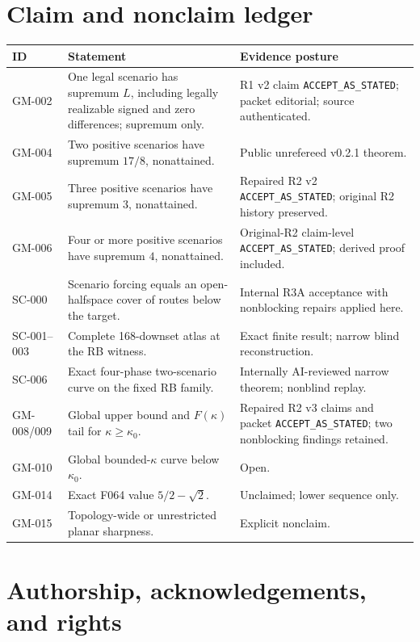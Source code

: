 \documentclass[11pt]{article}
\theoremstyle{remark}
\begin{document}
\section{Claim and nonclaim ledger}

\begin{longtable}{@{}
  >{\raggedright\arraybackslash}p{}
  >{\raggedright\arraybackslash}p{}
  >{\raggedright\arraybackslash}p{}@{}}
\toprule
ID & Statement & Evidence posture\\
\midrule
\endhead
GM-002 & One legal scenario has supremum $L$, including legally realizable
signed and zero differences; supremum only. & R1 v2 claim
\texttt{ACCEPT\_AS\_STATED}; packet editorial; source authenticated.\\
GM-004 & Two positive scenarios have supremum $17/8$, nonattained. & Public
unrefereed v0.2.1 theorem.\\
GM-005 & Three positive scenarios have supremum $3$, nonattained. & Repaired
R2 v2 \texttt{ACCEPT\_AS\_STATED}; original R2 history preserved.\\
GM-006 & Four or more positive scenarios have supremum $4$, nonattained. &
Original-R2 claim-level \texttt{ACCEPT\_AS\_STATED}; derived proof included.\\
SC-000 & Scenario forcing equals an open-halfspace cover of routes below the
target. & Internal R3A acceptance with nonblocking repairs applied here.\\
SC-001--003 & Complete 168-downset atlas at the RB witness. & Exact finite
result; narrow blind reconstruction.\\
SC-006 & Exact four-phase two-scenario curve on the fixed RB family. &
Internally AI-reviewed narrow theorem; nonblind replay.\\
GM-008/009 & Global upper bound and $F(\kappa)$ tail for
$\kappa\ge\kappa_0$. & Repaired R2 v3 claims and packet
\texttt{ACCEPT\_AS\_STATED}; two nonblocking findings retained.\\
GM-010 & Global bounded-$\kappa$ curve below $\kappa_0$. & Open.\\
GM-014 & Exact F064 value $5/2-\sqrt2$. & Unclaimed; lower sequence only.\\
GM-015 & Topology-wide or unrestricted planar sharpness. & Explicit
nonclaim.\\
\bottomrule
\end{longtable}

\section*{Authorship, acknowledgements, and rights}
\end{document}
